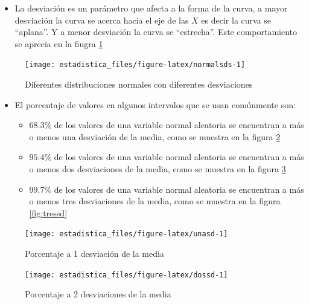 \documentclass[]{book}
\providecommand{\tightlist}{%
  \setlength{\itemsep}{0pt}\setlength{\parskip}{0pt}}
\begin{document}
\begin{itemize}
\tightlist
\item
  La desviación es un parámetro que afecta a la forma de la curva, a mayor desviación la curva se acerca hacia el eje de las \(X\) es decir la curva se ``aplana''. Y a menor desviación la curva se ``estrecha''. Este comportamiento se aprecia en la fiugra \ref{fig:normalsds}
\end{itemize}

\begin{figure}[h!]

{\centering \texttt{[image: estadistica\_files/figure-latex/normalsds-1]} 

}

\caption{Diferentes distribuciones normales con diferentes desviaciones}\label{fig:normalsds}
\end{figure}

\begin{itemize}
\tightlist
\item
  El porcentaje de valores en algunos intervalos que se usan comúnmente son:

  \begin{itemize}
  \tightlist
  \item
    \(68.3\%\) de los valores de una variable normal aleatoria se encuentran a más o menos una desviación de la media, como se muestra en la figura \ref{fig:unasd}
  \item
    \(95.4\%\) de los valores de una variable normal aleatoria se encuentran a más o menos dos desviaciones de la media, como se muestra en la figura \ref{fig:dossd}
  \item
    \(99.7\%\) de los valores de una variable normal aleatoria se encuentran a más o menos tres desviaciones de la media, como se muestra en la figura \ref{fig:tressd}
  \end{itemize}
\end{itemize}

\begin{figure}[h!]

{\centering \texttt{[image: estadistica\_files/figure-latex/unasd-1]} 

}

\caption{Porcentaje a 1 desviación de la media}\label{fig:unasd}
\end{figure}

\begin{figure}[h!]

{\centering \texttt{[image: estadistica\_files/figure-latex/dossd-1]} 

}

\caption{Porcentaje a 2 desviaciones de la media}\label{fig:dossd}
\end{figure}
\end{document}
